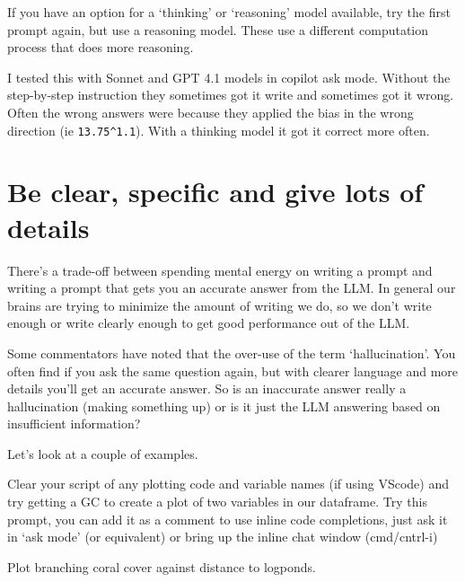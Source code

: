 \documentclass[
  letterpaper,
  DIV=11,
  numbers=noendperiod]{scrreprt}
\begin{document}
If you have an option for a `thinking' or `reasoning' model available,
try the first prompt again, but use a reasoning model. These use a
different computation process that does more reasoning.

I tested this with Sonnet and GPT 4.1 models in copilot ask mode.
Without the step-by-step instruction they sometimes got it write and
sometimes got it wrong. Often the wrong answers were because they
applied the bias in the wrong direction (ie \texttt{13.75\^{}1.1}). With
a thinking model it got it correct more often.

\section{Be clear, specific and give lots of
details}\label{be-clear-specific-and-give-lots-of-details}

There's a trade-off between spending mental energy on writing a prompt
and writing a prompt that gets you an accurate answer from the LLM. In
general our brains are trying to minimize the amount of writing we do,
so we don't write enough or write clearly enough to get good performance
out of the LLM.

Some commentators have noted that the over-use of the term
`hallucination'. You often find if you ask the same question again, but
with clearer language and more details you'll get an accurate answer. So
is an inaccurate answer really a hallucination (making something up) or
is it just the LLM answering based on insufficient information?

Let's look at a couple of examples.

Clear your script of any plotting code and variable names (if using
VScode) and try getting a GC to create a plot of two variables in our
dataframe. Try this prompt, you can add it as a comment to use inline
code completions, just ask it in `ask mode' (or equivalent) or bring up
the inline chat window (cmd/cntrl-i)

\begin{tcolorbox}[enhanced jigsaw, coltitle=black, breakable, toptitle=1mm, titlerule=0mm, bottomtitle=1mm, colframe=quarto-callout-note-color-frame, left=2mm, leftrule=.75mm, title=\textcolor{quarto-callout-note-color}{\faInfo}\hspace{0.5em}{Note}, opacityback=0, colback=white, opacitybacktitle=0.6, bottomrule=.15mm, arc=.35mm, rightrule=.15mm, toprule=.15mm, colbacktitle=quarto-callout-note-color!10!white]

Plot branching coral cover against distance to logponds.

\end{tcolorbox}
\end{document}
